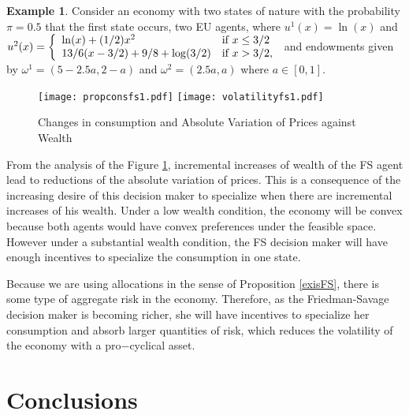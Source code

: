 \documentclass[pdftex]{article}
\numberwithin{equation}{section}
\theoremstyle{th}
\newtheorem{proof lemma}{{Proof Lemma}.}
\theoremstyle{definition}
\newtheorem{example}{Example}%
\newtheorem*{risk lovers}{Risk lovers}
\newtheorem*{risk averse}{Risk averse}
\begin{document}
{\begin{example}
Consider an economy with two states of nature with the probability $\pi=0.5$ that the first state occurs, two EU agents, where $u^1(x)=\ln(x)$ and $u^2(x)=\left\{\begin{array}{ll}\ln(x)+(1/2)x^2 & \textnormal{if }x\leq3/2 \\ 13/6(x-3/2)+9/8+\log(3/2) & \textnormal{if }x>3/2,\end{array}\right.$ and endowments given by $\omega^1=(5-2.5a,2-a)$ and $\omega^2=(2.5a,a)$ where $a\in[0,1]$.
\begin{center}
\begin{figure}[ht]
\texttt{[image: propconsfs1.pdf]}
\texttt{[image: volatilityfs1.pdf]}
\vspace{-0.3cm}
\caption{Changes in consumption and Absolute Variation of Prices against Wealth\label{grapfs}}
\end{figure}
\end{center}
\vspace{-0.5cm}
From the analysis of the Figure \ref{grapfs}, incremental increases of wealth of the FS agent lead to reductions of the absolute variation of prices. This is a consequence of the increasing desire of this decision maker to specialize when there are incremental increases of his wealth. Under a low wealth condition, the economy will be convex because both agents would have convex preferences under the feasible space. However under a substantial wealth condition, the FS decision maker will have enough incentives to specialize the consumption in one state.

Because we are using allocations in the sense of Proposition \ref{exisFS}, there is some type of aggregate risk in the economy. Therefore, as the Friedman-Savage decision maker is becoming richer, she will have incentives to specialize her consumption and absorb larger quantities of risk, which reduces the volatility of the economy with a pro$-$cyclical asset.



\end{example}




\section{Conclusions}

}
\end{document}
